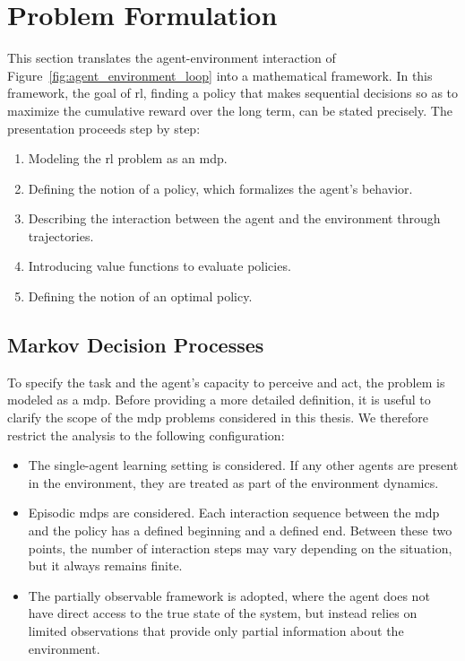 \section{Problem Formulation}
\label{sec:reinforcement_learning_problem_formulation}

This section translates the agent-environment interaction of Figure~\ref{fig:agent_environment_loop} into a mathematical framework.
In this framework, the goal of \gls{rl}, finding a policy that makes sequential decisions so as to maximize the cumulative reward over the long term, can be stated precisely.
The presentation proceeds step by step:
\begin{enumerate}
    \item Modeling the \gls{rl} problem as an \gls{mdp}.
    \item Defining the notion of a policy, which formalizes the agent's behavior.
    \item Describing the interaction between the agent and the environment through trajectories.
    \item Introducing value functions to evaluate policies.
    \item Defining the notion of an optimal policy.
\end{enumerate}

\subsection{Markov Decision Processes}
\label{subsec:markov_decision_processes}

To specify the task and the agent's capacity to perceive and act, the problem is modeled as a \gls{mdp}.
Before providing a more detailed definition, it is useful to clarify the scope of the \gls{mdp} problems considered in this thesis.
We therefore restrict the analysis to the following configuration:

\begin{itemize}
    \item The single-agent learning setting is considered.
    If any other agents are present in the environment, they are treated as part of the environment dynamics.

    \item Episodic \glspl{mdp} are considered.  
    Each interaction sequence between the \gls{mdp} and the policy has a defined beginning and a defined end.  
    Between these two points, the number of interaction steps may vary depending on the situation, but it always remains finite.

    \item The partially observable framework is adopted, where the agent does not have direct access to the true state of the system, but instead relies on limited observations that provide only partial information about the environment.  
\end{itemize}

